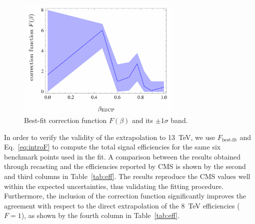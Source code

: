 \begin{figure}[t]
\centering
\includegraphics[width=0.7\textwidth]{ch5-figures/HSCP_13TeV_fitB.pdf}
\caption{Best-fit correction function $F(\beta)$ and its $ \pm 1\sigma$ band.
}
\label{fig:F}
\end{figure}

In order to verify the validity of the extrapolation to 13~TeV,
we use $F_\text{best-fit}$ and Eq.~\eqref{eq:introF} to compute the total signal
efficiencies for the same six benchmark points used in the fit. A comparison
between the results obtained through recasting and the efficiencies reported by
CMS is shown by the second and third columns in Table~\ref{tab:eff}.
The results reproduce the CMS values well within the expected uncertainties,
thus validating the fitting procedure.
Furthermore, the inclusion of the correction function significantly improves the
agreement with respect to the direct extrapolation of the 8~TeV
efficiencies ($F=1$), as shown by the fourth column in Table~\ref{tab:eff}.

